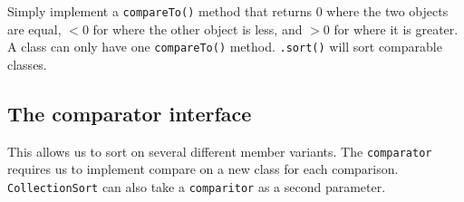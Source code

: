 Simply implement a \texttt{compareTo()} method that returns \(0\) where the two objects are equal, \(<0\) for where the other object is less, and \(>0\) for where it is greater.
A class can only have one \texttt{compareTo()} method.
\texttt{.sort()} will sort comparable classes.

\subsection{The comparator interface}\label{sub:the_comparator_interface}

This allows us to sort on several different member variants.
The \texttt{comparator} requires us to implement compare on a new class for each comparison.
\texttt{CollectionSort} can also take a \texttt{comparitor} as a second parameter.
